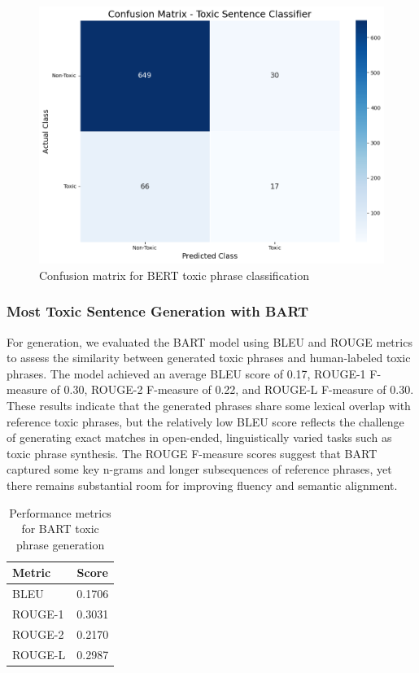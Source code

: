 \documentclass[conference]{IEEEtran}
\begin{document}
\begin{figure}[H]
  \centering
  \includegraphics[width=\columnwidth]{figures/bert_toxic_confusion_matrix.png}
  \caption{Confusion matrix for BERT toxic phrase classification}
  \label{fig:bert_cm_toxic}
\end{figure}

\subsubsection{Most Toxic Sentence Generation with BART}
\noindent

For generation, we evaluated the BART model using BLEU and ROUGE metrics to assess the similarity between generated toxic phrases and human-labeled toxic phrases. The model achieved an average BLEU score of 0.17, ROUGE-1 F-measure of 0.30, ROUGE-2 F-measure of 0.22, and ROUGE-L F-measure of 0.30. These results indicate that the generated phrases share some lexical overlap with reference toxic phrases, but the relatively low BLEU score reflects the challenge of generating exact matches in open-ended, linguistically varied tasks such as toxic phrase synthesis. The ROUGE F-measure scores suggest that BART captured some key n-grams and longer subsequences of reference phrases, yet there remains substantial room for improving fluency and semantic alignment.

\begin{table}[H]
\centering
\caption{Performance metrics for BART toxic phrase generation}
\begin{tabular}{lc}
\toprule
\textbf{Metric} & \textbf{Score} \\
\midrule
BLEU & 0.1706 \\
ROUGE-1 & 0.3031 \\
ROUGE-2 & 0.2170 \\
ROUGE-L & 0.2987 \\
\bottomrule
\end{tabular}
\end{table}
\end{document}
